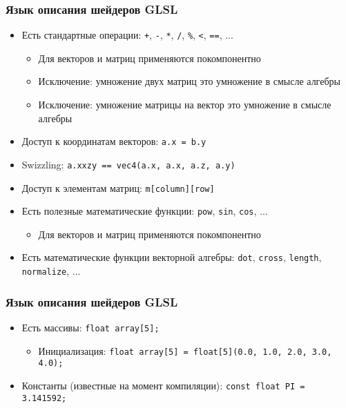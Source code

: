 \documentclass{beamer}
\begin{document}
\begin{frame}[fragile]
\frametitle{Язык описания шейдеров GLSL}
\begin{itemize}
\item Есть стандартные операции: \verb|+|, \verb|-|, \verb|*|, \verb|/|, \verb|%|, \verb|<|, \verb|==|, ...
\pause
\begin{itemize}
\item Для векторов и матриц применяются покомпонентно
\pause
\item Исключение: умножение двух матриц это умножение в смысле алгебры
\pause
\item Исключение: умножение матрицы на вектор это умножение в смысле алгебры
\end{itemize}
\pause
\item Доступ к координатам векторов: \verb|a.x = b.y|
\pause
\item Swizzling: \verb|a.xxzy == vec4(a.x, a.x, a.z, a.y)|
\pause
\item Доступ к элементам матриц: \verb|m[column][row]|
\pause
\item Есть полезные математические функции: \verb|pow|, \verb|sin|, \verb|cos|, ...
\pause
\begin{itemize}
\item Для векторов и матриц применяются покомпонентно
\end{itemize}
\pause
\item Есть математические функции векторной алгебры: \verb|dot|, \verb|cross|, \verb|length|, \verb|normalize|, ...
\end{itemize}
\end{frame}

\begin{frame}[fragile]
\frametitle{Язык описания шейдеров GLSL}
\begin{itemize}
\item Есть массивы: \verb|float array[5];|
\pause
\begin{itemize}
\item Инициализация: \verb|float array[5] = float[5](0.0, 1.0, 2.0, 3.0, 4.0);|
\end{itemize}
\pause
\item Константы (известные на момент компиляции): \verb|const float PI = 3.141592;|
\end{itemize}
\end{frame}
\end{document}
